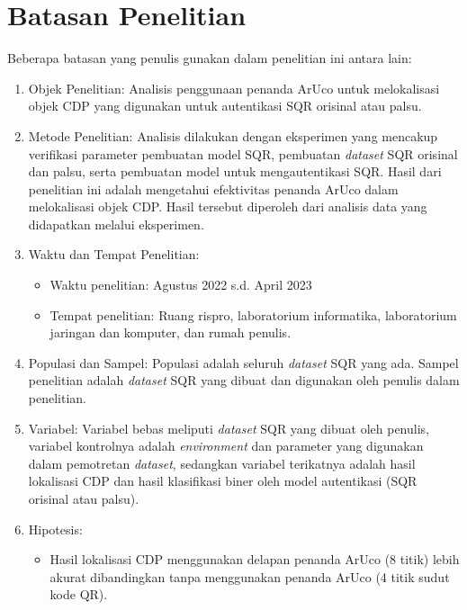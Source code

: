 \section{Batasan Penelitian}
Beberapa batasan yang penulis gunakan dalam penelitian ini antara lain:
\begin{enumerate}
      \item Objek Penelitian: Analisis penggunaan penanda ArUco untuk melokalisasi objek CDP yang digunakan untuk autentikasi SQR orisinal atau palsu.
      \item Metode Penelitian: Analisis dilakukan dengan eksperimen yang mencakup verifikasi parameter pembuatan model SQR, pembuatan \emph{dataset} SQR orisinal dan
            palsu, serta pembuatan model untuk mengautentikasi SQR. Hasil dari penelitian ini adalah mengetahui efektivitas penanda ArUco dalam melokalisasi objek CDP.
            Hasil tersebut diperoleh dari analisis data yang didapatkan melalui eksperimen.
      \item Waktu dan Tempat Penelitian:
            \begin{itemize}
                  \item Waktu penelitian: Agustus 2022 s.d. April 2023
                  \item Tempat penelitian: Ruang rispro, laboratorium informatika, laboratorium jaringan dan komputer, dan rumah penulis.
            \end{itemize}
      \item Populasi dan Sampel: Populasi adalah seluruh \emph{dataset} SQR yang ada. Sampel penelitian adalah \emph{dataset} SQR yang dibuat dan digunakan oleh penulis
            dalam penelitian.
      \item Variabel: Variabel bebas meliputi \emph{dataset} SQR yang dibuat oleh penulis, variabel kontrolnya adalah \emph{environment} dan parameter yang digunakan dalam
            pemotretan \emph{dataset}, sedangkan variabel terikatnya adalah hasil lokalisasi CDP dan hasil klasifikasi biner oleh model autentikasi (SQR orisinal atau
            palsu).
      \item Hipotesis:
            \begin{itemize}
                  \item Hasil lokalisasi CDP menggunakan delapan penanda ArUco (8 titik) lebih akurat dibandingkan tanpa menggunakan penanda ArUco (4 titik sudut kode QR).

\end{itemize}
\end{enumerate}
